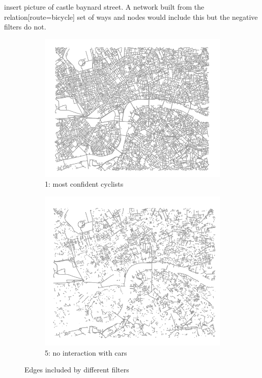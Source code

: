 \documentclass[11pt]{article} %
\begin{document}
insert picture of castle baynard street. A network built from the relation[route=bicycle] set of ways and nodes would include this but the negative filters do not. 


\begin{figure}
\centering
\begin{subfigure}{.5\textwidth}
  \centering
  \includegraphics[width=1\linewidth]{bbox_bike_1_filter_cropped}
  \caption{1: most confident cyclists}
  \label{fig:sub1}
\end{subfigure}
\begin{subfigure}{.5\textwidth}
  \centering
  \includegraphics[width=1\linewidth]{bbox_bike_5_filter_cropped}
  \caption{5: no interaction with cars }
  \label{fig:sub2}
\end{subfigure}
\caption{Edges included by different filters}
\label{fig:test}
\end{figure}
\end{document}

